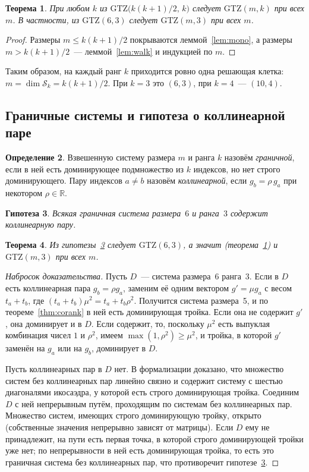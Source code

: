 \documentclass[11pt,a4paper]{article}
\theoremstyle{plain}
\newtheorem{theorem}{Теорема}[section]
\newtheorem{conjecture}[theorem]{Гипотеза}
\theoremstyle{definition}
\newtheorem{definition}[theorem]{Определение}
\theoremstyle{remark}
\newcommand{\RR}{\mathbb{R}}
\newcommand{\GTZ}{\mathrm{GTZ}}
\newcommand{\Sk}{\mathcal{S}}
\begin{document}
\begin{theorem}\label{thm:top}
При любом $k$ из $\GTZ\bigl(k(k+1)/2,\,k\bigr)$ следует $\GTZ(m,k)$ при всех $m$.
В частности, из $\GTZ(6,3)$ следует $\GTZ(m,3)$ при всех $m$.
\end{theorem}
\begin{proof}
Размеры $m\le k(k+1)/2$ покрываются леммой~\ref{lem:mono}, а размеры
$m>k(k+1)/2$~--- леммой~\ref{lem:walk} и индукцией по $m$.
\end{proof}

Таким образом, на каждый ранг $k$ приходится ровно одна решающая клетка:
$m=\dim\Sk_k=k(k+1)/2$. При $k=3$ это $(6,3)$, при $k=4$~--- $(10,4)$.

\subsection{Граничные системы и гипотеза о коллинеарной паре}

\begin{definition}\label{def:tie}
Взвешенную систему размера $m$ и ранга $k$ назовём \emph{граничной}, если
в ней есть доминирующее подмножество из $k$ индексов, но нет строго
доминирующего. Пару индексов $a\ne b$ назовём \emph{коллинеарной}, если
$g_b=\rho\,g_a$ при некотором $\rho\in\RR$.
\end{definition}

\begin{conjecture}\label{conj:hinge}
Всякая граничная система размера~$6$ и ранга~$3$ содержит коллинеарную пару.
\end{conjecture}

\begin{theorem}\label{thm:hinge}
Из гипотезы~\ref{conj:hinge} следует $\GTZ(6,3)$, а значит
(теорема~\ref{thm:top}) и $\GTZ(m,3)$ при всех $m$.
\end{theorem}
\begin{proof}[Набросок доказательства]
Пусть $D$~--- система размера~6 ранга~3. Если в $D$ есть коллинеарная пара
$g_b=\rho g_a$, заменим её одним вектором $g'=\mu g_a$ с весом $t_a+t_b$, где
$(t_a+t_b)\mu^2=t_a+t_b\rho^2$. Получится система размера~5, и по
теореме~\ref{thm:corank} в ней есть доминирующая тройка. Если она не содержит
$g'$, она доминирует и в $D$. Если содержит, то, поскольку $\mu^2$ есть
выпуклая комбинация чисел $1$ и $\rho^2$, имеем $\max(1,\rho^2)\ge\mu^2$, и
тройка, в которой $g'$ заменён на $g_a$ или на $g_b$, доминирует в $D$.

Пусть коллинеарных пар в $D$ нет. В формализации доказано, что множество
систем без коллинеарных пар линейно связно и содержит систему с шестью
диагоналями икосаэдра, у которой есть строго доминирующая тройка. Соединим
$D$ с ней непрерывным путём, проходящим по системам без коллинеарных пар.
Множество систем, имеющих строго доминирующую тройку, открыто (собственные
значения непрерывно зависят от матрицы). Если $D$ ему не принадлежит, на
пути есть первая точка, в которой строго доминирующей тройки уже нет; по
непрерывности в ней есть доминирующая тройка, то есть это граничная система
без коллинеарных пар, что противоречит гипотезе~\ref{conj:hinge}.
\end{proof}
\end{document}
